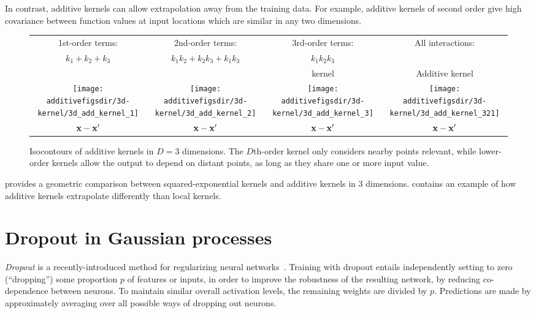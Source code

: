 In contrast, additive kernels can allow extrapolation away from the training data.
For example, additive kernels of second order give high covariance between function values at input locations which are similar in any two dimensions.

\begin{figure}[h!]
\centering
\renewcommand{\tabcolsep}{0pt}
\begin{tabular}{cccc}
1st-order terms: & 2nd-order terms: &  3rd-order terms: & All interactions: \\
$k_1 + k_2 + k_3$ & $k_1k_2 + k_2k_3 + k_1k_3$ & $k_1k_2k_3$ & \\
& & \seard{} kernel & Additive kernel\\
\texttt{[image: \\additivefigsdir/3d-kernel/3d\_add\_kernel\_1]} &
\texttt{[image: \\additivefigsdir/3d-kernel/3d\_add\_kernel\_2]} &
\texttt{[image: \\additivefigsdir/3d-kernel/3d\_add\_kernel\_3]} & 
\texttt{[image: \\additivefigsdir/3d-kernel/3d\_add\_kernel\_321]}\\
${\bf{x}} - {\bf{x}}'$ & ${\bf{x}} - {\bf{x}}'$ & ${\bf{x}} - {\bf{x}}'$ & ${\bf{x}} - {\bf{x}}'$\\[0.5em]
\end{tabular}
\caption[Isocontours of additive kernels in 3 dimensions]
{Isocontours of additive kernels in $D = 3$ dimensions.
The $D$th-order kernel only considers nearby points relevant, while lower-order kernels allow the output to depend on distant points, as long as they share one or more input value.}
\label{fig:kernels3d}
\end{figure}


 provides a geometric comparison between squared-exponential kernels and additive kernels in 3 dimensions.
 contains an example of how additive kernels extrapolate differently than local kernels.




\section{Dropout in Gaussian processes}
\label{sec:dropout-gps}

\emph{Dropout} is a recently-introduced method for regularizing neural networks~\citep{hinton2012improving, srivastava2013improving}.
Training with dropout entails independently setting to zero (``dropping'') some proportion $p$ of features or inputs, in order to improve the robustness of the resulting network, by reducing co-dependence between neurons.
To maintain similar overall activation levels, the remaining weights are divided by $p$.
Predictions are made by approximately averaging over all possible ways of dropping out neurons.

